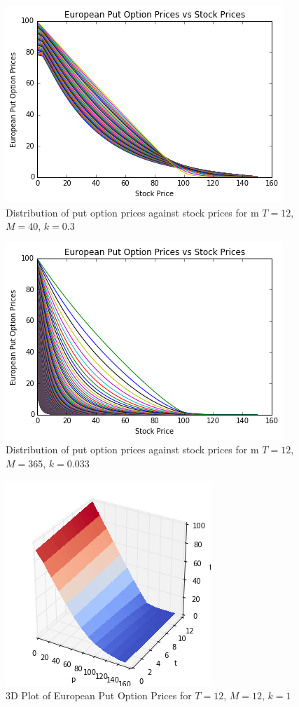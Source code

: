 \documentclass[paper=a4, fontsize=10pt]{scrartcl} %
\begin{document}
\begin{figure}[h!]
\center
\includegraphics[scale=0.8]{vary1240.png}
\caption{Distribution of put option prices against stock prices for m $T=12$, $M=40$, $k=0.3$}
\end{figure}

\begin{figure}[h!]
\center
\includegraphics[scale=0.8]{vary12365.png}
\caption{Distribution of put option prices against stock prices for m $T=12$, $M=365$, $k=0.033$}
\end{figure}


\begin{figure}[h!]
\center
\includegraphics[scale=0.8]{3d_k_12_12.png}
\caption{3D Plot of European Put Option Prices for $T=12$, $M=12$, $k=1$}
\end{figure}
\end{document}
